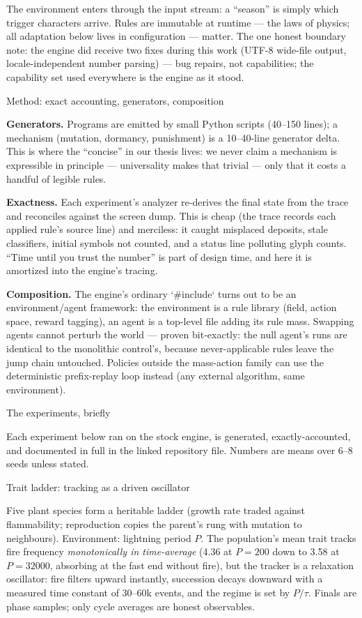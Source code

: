 The environment enters through the input stream: a ``season'' is
simply which trigger characters arrive. Rules are immutable at
runtime --- the laws of physics; all adaptation below lives in
configuration --- matter. The one honest boundary note: the engine
did receive two fixes during this work (UTF-8 wide-file output,
locale-independent number parsing) --- bug repairs, not capabilities;
the capability set used everywhere is the engine as it stood.

\sec Method: exact accounting, generators, composition

{\bf Generators.} Programs are emitted by small Python scripts
(40--150 lines); a mechanism (mutation, dormancy, punishment) is a
10--40-line generator delta. This is where the ``concise''
in our thesis lives: we never claim a mechanism is expressible in
principle --- universality makes that trivial --- only that it costs
a handful of legible rules.

{\bf Exactness.} Each experiment's analyzer re-derives the final
state from the trace and reconciles against the screen dump. This is
cheap (the trace records each applied rule's source line) and
merciless: it caught misplaced deposits, stale classifiers, initial
symbols not counted, and a status line polluting glyph counts.
``Time until you trust the number'' is part of design time, and here
it is amortized into the engine's tracing.

{\bf Composition.} The engine's ordinary `#include` turns out to be
an environment/agent framework: the environment is a rule library
(field, action space, reward tagging), an agent is a top-level file
adding its rule mass. Swapping agents cannot perturb the world ---
proven bit-exactly: the null agent's runs are identical to the
monolithic control's, because never-applicable rules leave the jump
chain untouched. Policies outside the mass-action family can use the
deterministic prefix-replay loop instead (any external algorithm,
same environment).

\sec The experiments, briefly

Each experiment below ran on the stock engine, is generated,
exactly-accounted, and documented in full in the linked repository
file. Numbers are means over 6--8 seeds unless stated.

\secc Trait ladder: tracking as a driven oscillator

Five plant species form a heritable ladder (growth rate traded
against flammability; reproduction copies the parent's rung with
mutation to neighbours). Environment: lightning period $P$.
The population's mean trait tracks fire frequency {\it monotonically
in time-average} (4.36 at $P{=}200$ down to 3.58 at $P{=}32000$,
absorbing at the fast end without fire), but the tracker is a
relaxation oscillator: fire filters upward instantly, succession
decays downward with a measured time constant of 30--60k events, and
the regime is set by $P/\tau$. Finals are phase samples; only cycle
averages are honest observables.
\hfil\break{}


